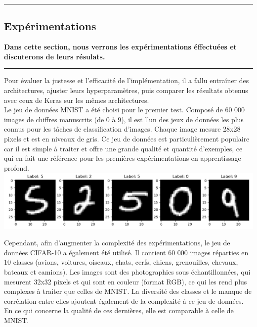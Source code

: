 {\color{gray}\hrule}
\begin{center}
\section{Expérimentations}
\textbf{Dans cette section, nous verrons les expérimentations éffectuées et discuterons de leurs résulats.}
\bigskip
\end{center}
{\color{gray}\hrule}
\begin{multicols}{2}

Pour évaluer la justesse et l’efficacité de l’implémentation, il a fallu entraîner 
des architectures, ajuster leurs hyperparamètres, puis comparer les résultats obtenus avec 
ceux de Keras sur les mêmes architectures. \\

Le jeu de données MNIST a été choisi pour le premier test. Composé de 
60 000 images de chiffres manuscrits (de 0 à 9), il est l’un des jeux de données 
les plus connus pour les tâches de classification d’images. Chaque image mesure 
28x28 pixels et est en niveaux de gris. Ce jeu de données est particulièrement
populaire car il est simple à traiter et offre une grande qualité et quantité 
d’exemples, ce qui en fait une référence pour les premières expérimentations en 
apprentissage profond. \\

\includegraphics[width=\columnwidth]{images/mnist_samples.png}
\hfill\break

Cependant, afin d’augmenter la complexité des expérimentations, le jeu de données CIFAR-10 a également 
été utilisé. Il contient 60 000 images réparties en 10 classes (avions, voitures, oiseaux, chats, cerfs, 
chiens, grenouilles, chevaux, bateaux et camions). Les images sont des photographies sous échantillonnées, qui mesurent 32x32 pixels et qui sont en couleur 
(format RGB), ce qui les rend plus complexes à traiter que celles de MNIST. La diversité des classes et le manque de corrélation 
entre elles ajoutent également de la complexité à ce jeu de données. En ce qui concerne la qualité de ces dernières,
elle est comparable à celle de MNIST. \\


\end{multicols}
